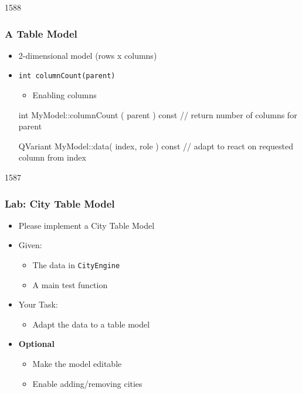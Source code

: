 \begin{slide}[fragile]{1588}\frametitle{A Table Model}
  \begin{itemize}
  \item 2-dimensional model (rows x columns)
  \item \texttt{int columnCount(parent)}
   \begin{itemize}
   \item Enabling columns
   \end{itemize}
    \begin{cpp}
int MyModel::columnCount ( parent ) const {
  // return number of columns for parent
}

QVariant MyModel::data( index, role ) const {
 // adapt to react on requested column from index
}
    \end{cpp}
  \end{itemize}
\end{slide}


\begin{slide}{1587}\frametitle{Lab: City Table Model}
  \begin{itemize}
  \item Please implement a City Table Model
  \item Given:
    \begin{itemize}
    \item The data  in \texttt{CityEngine}
    \item A main test function
    \end{itemize}
  \item Your Task:
    \begin{itemize}
    \item Adapt the data to a table model
    \end{itemize}
  \item \textbf{Optional}
    \begin{itemize}
    \item Make the model editable
    \item Enable adding/removing cities
   \end{itemize}
 \end{itemize}
 
\end{slide}



